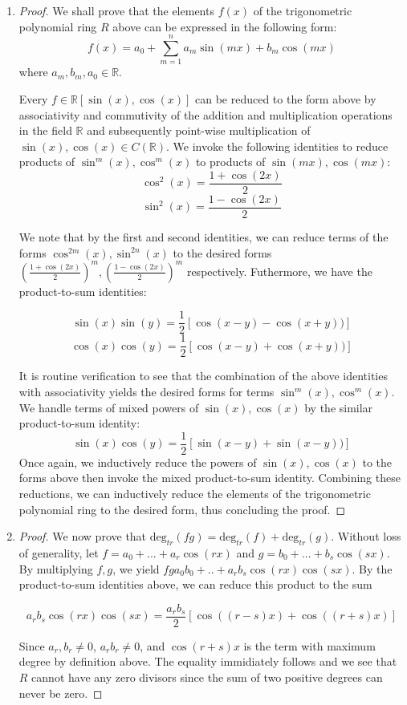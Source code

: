 \documentclass[Lang.tex]{subfiles}
\begin{document}
\begin{enumerate}
	\item
		\begin{proof}
			We shall prove that the elements $f(x)$ of the trigonometric polynomial ring $R$ above can be expressed in the following form:
			$$ f(x) = a_0 + \sum_{m=1}^n a_m \sin(mx) + b_m \cos(mx)  $$
			where $a_m,b_m,a_0 \in \mathbb{R}$.  
			
			Every $f \in \mathbb{R}[\sin(x),\cos(x)]$ can be reduced to the form above by associativity and commutivity of the addition and multiplication operations in the field $\mathbb{R}$ and subsequently point-wise multiplication of $\sin(x),\cos(x) \in C(\mathbb{R})$. We invoke the following identities to reduce products of $\sin^m(x),\cos^m(x)$ to products of $\sin(mx), \cos(mx)$:
			$$ \cos^2(x) = \frac{1 + \cos(2x)}{2} $$
			$$ \sin^2(x) = \frac{1 - \cos(2x)}{2} $$
			
			We note that by the first and second identities, we can reduce terms of the forms $\cos^{2m}(x),\sin^{2n}(x)$ to the desired forms $(\frac{1 + \cos(2x)}{2})^m, (\frac{1 - \cos(2x)}{2})^m$ respectively. Futhermore, we have the product-to-sum identities:
			
			$$ \sin(x)\sin(y) = \frac{1}{2}[\cos(x - y) - \cos(x+y))] $$
			$$ \cos(x)\cos(y) = \frac{1}{2}[\cos(x - y) + \cos(x+y))] $$
			
			It is routine verification to see that the combination of the above identities with associativity yields the desired forms for terms $\sin^m(x),\cos^m(x)$. We handle terms of mixed powers of $\sin(x), \cos(x)$ by the similar product-to-sum identity:
			$$ \sin(x)\cos(y) = \frac{1}{2}[\sin(x - y) + \sin(x-y))] $$
			Once again, we inductively reduce the powers of $\sin(x),\cos(x)$ to the forms above then invoke the mixed product-to-sum identity. Combining these reductions, we can inductively reduce the elements of the trigonometric polynomial ring to the desired form, thus concluding the proof.
			
			\end{proof}
			\item 
		
			    	\begin{proof}
			    		We now prove that $\text{deg}_{tr}(fg) = \text{deg}_{tr}(f) + \text{deg}_{tr}(g)$. Without loss of generality, let $f = a_0 + ... + a_r \cos(rx)$ and $g = b _0 + ... + b_s \cos(sx)$. By multiplying $f,g$, we yield $fg a_0b_0 + .. + a_rb_s\cos(rx)\cos(sx)$. By the product-to-sum identities above, we can reduce this product to the sum
			    		
			    		$$ a_rb_s\cos(rx)\cos(sx) = \frac{a_rb_s}{2}[\cos((r-s)x) + \cos((r+s)x)] $$
			    		
			    		Since $a_r,b_r \neq 0$, $a_rb_r \neq 0$, and $\cos(r+s)x$ is the term with maximum degree by definition above. The equality immidiately follows and we see that $R$ cannot have any zero divisors since the sum of two positive degrees can never be zero. 
					\end{proof}
				\end{enumerate}
			
\end{document}
